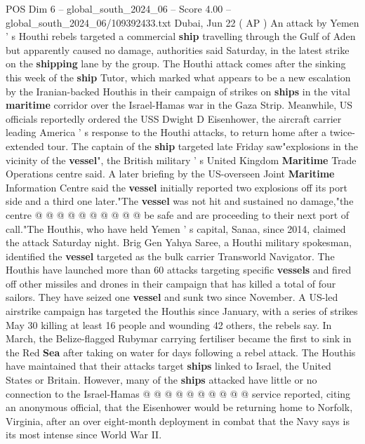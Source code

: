 \begin{textsample}{POS Dim 6 – global\_south\_2024\_06 – Score 4.00 – global\_south\_2024\_06/109392433.txt}  \label{ex:f6_pos_159}
Dubai, Jun 22 ( AP ) An attack by Yemen ' s Houthi rebels targeted a commercial \textbf{ship} travelling through the Gulf of Aden but apparently caused no damage, authorities said Saturday, in the latest strike on the \textbf{shipping} lane by the group.
The Houthi attack comes after the sinking this week of the \textbf{ship} Tutor, which marked what appears to be a new escalation by the Iranian-backed Houthis in their campaign of strikes on \textbf{ships} in the vital \textbf{maritime} corridor over the Israel-Hamas war in the Gaza Strip.
Meanwhile, US officials reportedly ordered the USS Dwight D Eisenhower, the aircraft carrier leading America ' s response to the Houthi attacks, to return home after a twice-extended tour.
The captain of the \textbf{ship} targeted late Friday saw"explosions in the vicinity of the \textbf{vessel}", the British military ' s United Kingdom \textbf{Maritime} Trade Operations centre said.
A later briefing by the US-overseen Joint \textbf{Maritime} Information Centre said the \textbf{vessel} initially reported two explosions off its port side and a third one later."The \textbf{vessel} was not hit and sustained no damage,"the centre @ @ @ @ @ @ @ @ @ @ be safe and are proceeding to their next port of call."The Houthis, who have held Yemen ' s capital, Sanaa, since 2014, claimed the attack Saturday night.
Brig Gen Yahya Saree, a Houthi military spokesman, identified the \textbf{vessel} targeted as the bulk carrier Transworld Navigator.
The Houthis have launched more than 60 attacks targeting specific \textbf{vessels} and fired off other missiles and drones in their campaign that has killed a total of four sailors.
They have seized one \textbf{vessel} and sunk two since November.
A US-led airstrike campaign has targeted the Houthis since January, with a series of strikes May 30 killing at least 16 people and wounding 42 others, the rebels say.
In March, the Belize-flagged Rubymar carrying fertiliser became the first to sink in the Red \textbf{Sea} after taking on water for days following a rebel attack.
The Houthis have maintained that their attacks target \textbf{ships} linked to Israel, the United States or Britain.
However, many of the \textbf{ships} attacked have little or no connection to the Israel-Hamas @ @ @ @ @ @ @ @ @ @ service reported, citing an anonymous official, that the Eisenhower would be returning home to Norfolk, Virginia, after an over eight-month deployment in combat that the Navy says is its most intense since World War II.

\end{textsample}
